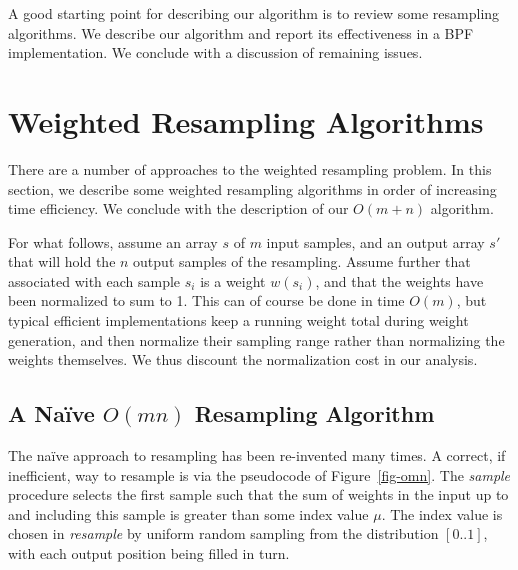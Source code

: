 \documentclass[12pt]{article}
\begin{document}
  A good starting point for describing our algorithm is to
  review some resampling algorithms.  We describe our
  algorithm and report its effectiveness in a BPF
  implementation.  We conclude with a discussion of
  remaining issues.

\section{Weighted Resampling Algorithms}

  There are a number of approaches to the weighted
  resampling problem.  In this section, we describe some
  weighted resampling algorithms in order of increasing time
  efficiency.  We conclude with the description of our
  $O(m + n)$ algorithm.

  For what follows, assume an array $s$ of $m$ input
  samples, and an output array $s'$ that will hold the $n$
  output samples of the resampling.  Assume further that
  associated with each sample $s_i$ is a weight $w(s_i)$,
  and that the weights have been normalized to sum to 1.
  This can of course be done in time $O(m)$, but typical
  efficient implementations keep a running weight total
  during weight generation, and then normalize their
  sampling range rather than normalizing the weights
  themselves.  We thus discount the normalization cost in
  our analysis.

\subsection{A Na\"ive $O(mn)$ Resampling Algorithm}\label{sec-naive}

  The na\"ive approach to resampling has been re-invented
  many times.  A correct, if inefficient, way to resample is
  via the pseudocode of Figure~\ref{fig-omn}.  The {\em
  sample} procedure selects the first sample such that the
  sum of weights in the input up to and including this
  sample is greater than some index value $\mu$.  The index
  value is chosen in {\em resample} by uniform random
  sampling from the distribution $[0..1]$, with each output
  position being filled in turn.
\end{document}
